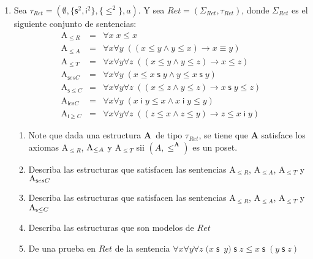\documentclass{article}
\begin{document}
\begin{enumerate}
\item Sea $\tau _{Ret}=(\emptyset ,\{\mathsf{s}^{2},\mathsf{i}^{2}\},\{\leq
^{2}\},a)$. Y sea $Ret=(\Sigma _{Ret},\tau _{Ret})$, donde $\Sigma _{Ret}$
es el siguiente conjunto de sentencias:%
\begin{eqnarray*}
\mathrm{A}_{\leq R} &=&\forall x\;x\leq x \\
\mathrm{A}_{\leq A} &=&\forall x\forall y\;\left( \left( x\leq y\wedge y\leq
x\right) \rightarrow x\equiv y\right)  \\
\mathrm{A}_{\leq T} &=&\forall x\forall y\forall z\;\left( (x\leq y\wedge
y\leq z)\rightarrow x\leq z\right)  \\
\mathrm{A}_{\mathsf{s}esC} &=&\forall x\forall y\;(x\leq x\;\mathsf{s}%
\;y\wedge y\leq x\;\mathsf{s}\;y) \\
\mathrm{A}_{\mathsf{s}\leq C} &=&\forall x\forall y\forall z\;\left( (x\leq
z\wedge y\leq z)\rightarrow x\;\text{$\mathsf{s\;}$}y\leq z\right)  \\
\mathrm{A}_{\mathsf{i}esC} &=&\forall x\forall y\;(x\;\mathsf{i}\;y\leq
x\wedge x\;\mathsf{i}\;y\leq y) \\
\mathrm{A}_{\mathsf{i}\geq C} &=&\forall x\forall y\forall z\;\left( (z\leq
x\wedge z\leq y)\rightarrow z\leq x\;\mathsf{i}\;y\right) 
\end{eqnarray*}

\begin{enumerate}
\item Note que dada una estructura $\mathbf{A}$\ de tipo $\tau _{Ret}$, se
tiene que $\mathbf{A}$ satisface los axiomas $\mathrm{A}_{\leq R}$, $\mathrm{%
A}_{\leq A}$ y $\mathrm{A}_{\leq T}$ sii $(A,\leq ^{\mathbf{A}})$ es un
poset.

\item Describa las estructuras que satisfacen las sentencias $\mathrm{A}%
_{\leq R}$, $\mathrm{A}_{\leq A}$, $\mathrm{A}_{\leq T}$ y $\mathrm{A}_{%
\mathsf{s}esC}$

\item Describa las estructuras que satisfacen las sentencias $\mathrm{A}%
_{\leq R}$, $\mathrm{A}_{\leq A}$, $\mathrm{A}_{\leq T}$ y $\mathrm{A}_{%
\mathsf{s}\leq C}$

\item Describa las estructuras que son modelos de $Ret$

\item De una prueba en $Ret$ de la sentencia $\forall x\forall y\forall
z\;(x\;\mathsf{s}$\ $y)\;\mathsf{s}\;z\leq x\;\mathsf{s}\;(y\;\mathsf{s}\;z)$


\end{enumerate}
\end{enumerate}
\end{document}
